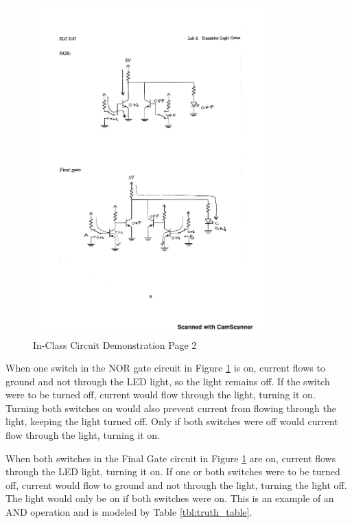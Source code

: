 \documentclass[11pt]{article}
\begin{document}
\begin{figure}\centering
	\includegraphics[width=0.8\textwidth,trim=2cm 6cm 2cm 2cm,clip]{Circuit_Demonstration(2!)}
	\caption{In-Class Circuit Demonstration Page 2}
	\label{fig:Circuit_Demonstration(2)}	
\end{figure}

\clearpage

When one switch in the NOR gate circuit in Figure \ref{fig:Circuit_Demonstration(2)} is on, current flows to ground and not through the LED light, so the light remains off. If the switch were to be turned off, current would flow through the light, turning it on. Turning both switches on would also prevent current from flowing through the light, keeping the light turned off. Only if both switches were off would current flow through the light, turning it on. 

When both switches in the Final Gate circuit in Figure \ref{fig:Circuit_Demonstration(2)} are on, current flows through the LED light, turning it on. If one or both switches were to be turned off, current would flow to ground and not through the light, turning the light off. The light would only be on if both switches were on. This is an example of an AND operation and is modeled by Table \ref{tbl:truth_table}.
\end{document}
